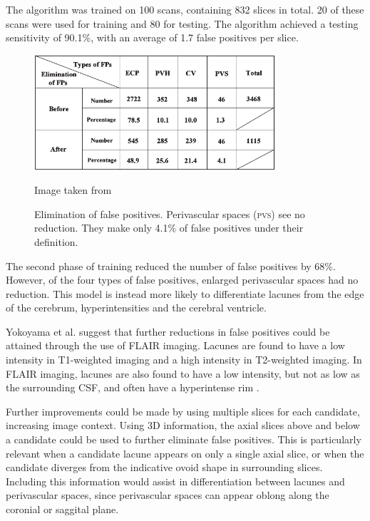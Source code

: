 The algorithm was trained on 100 scans, containing 832 slices in total. 20 of these scans were used for training and 80 for testing. The algorithm achieved a testing sensitivity of 90.1\%, with an average of 1.7 false positives per slice.

\begin{figure}[ht]
	\centering
	\includegraphics[width=0.8\textwidth]{Images/5_yokoyama2007testing.png}
	\caption{Elimination of false positives. Perivascular spaces (\textsc{pvs}) see no reduction. They make only 4.1\% of false positives under their definition.}
	\small Image taken from \cite{Yokoyama2007}
\end{figure}

The second phase of training reduced the number of false positives by 68\%. However, of the four types of false positives, enlarged perivascular spaces had no reduction. This model is instead more likely to differentiate lacunes from the edge of the cerebrum, hyperintensities and the cerebral ventricle.

Yokoyama et al. suggest that further reductions in false positives could be attained through the use of FLAIR imaging. Lacunes are found to have a low intensity in T1-weighted imaging and a high intensity in T2-weighted imaging. In FLAIR imaging, lacunes are also found to have a low intensity, but not as low as the surrounding CSF, and often have a hyperintense rim \cite{WardlawJ.M.2013Nsfr}. 

Further improvements could be made by using multiple slices for each candidate, increasing image context. Using 3D information, the axial slices above and below a candidate could be used to further eliminate false positives. This is particularly relevant when a candidate lacune appears on only a single axial slice, or when the candidate diverges from the indicative ovoid shape in surrounding slices. Including this information would assist in differentiation between lacunes and perivascular spaces, since perivascular spaces can appear oblong along the coronial or saggital plane.

